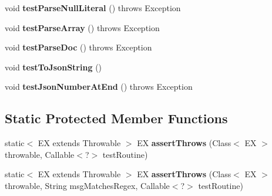 \begin{DoxyCompactItemize}
\mbox{\label{classcom_1_1mysql_1_1cj_1_1xdevapi_1_1_json_doc_test_a87d32172d62cd179173ff96e63bea6fc}} 
void {\bfseries test\+Parse\+Null\+Literal} ()  throws Exception 
\item 
\mbox{\label{classcom_1_1mysql_1_1cj_1_1xdevapi_1_1_json_doc_test_a0c5cb019a4ca515066aeb74e0dead7c7}} 
void {\bfseries test\+Parse\+Array} ()  throws Exception 
\item 
\mbox{\label{classcom_1_1mysql_1_1cj_1_1xdevapi_1_1_json_doc_test_a96d5f076a901d82a3b66a9002578daeb}} 
void {\bfseries test\+Parse\+Doc} ()  throws Exception 
\item 
\mbox{\label{classcom_1_1mysql_1_1cj_1_1xdevapi_1_1_json_doc_test_ad6e84d8faaeb70fabbf232e685f954a5}} 
void {\bfseries test\+To\+Json\+String} ()
\item 
\mbox{\label{classcom_1_1mysql_1_1cj_1_1xdevapi_1_1_json_doc_test_a94b6ac785be82d25a2ed230a121ba907}} 
void {\bfseries test\+Json\+Number\+At\+End} ()  throws Exception 
\end{DoxyCompactItemize}
\subsection*{Static Protected Member Functions}
\begin{DoxyCompactItemize}
\item 
\mbox{\label{classcom_1_1mysql_1_1cj_1_1xdevapi_1_1_json_doc_test_aa0bf76b32940e1bc6b8b944f7580f13a}} 
static$<$ EX extends Throwable $>$ EX {\bfseries assert\+Throws} (Class$<$ EX $>$ throwable, Callable$<$?$>$ test\+Routine)
\item 
\mbox{\label{classcom_1_1mysql_1_1cj_1_1xdevapi_1_1_json_doc_test_a3e6c08cae926e367bfadcd96c7d431d6}} 
static$<$ EX extends Throwable $>$ EX {\bfseries assert\+Throws} (Class$<$ EX $>$ throwable, String msg\+Matches\+Regex, Callable$<$?$>$ test\+Routine)
\end{DoxyCompactItemize}


